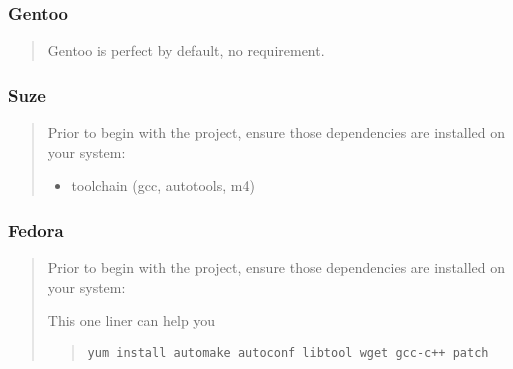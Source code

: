 \documentclass[letterpaper,10pt,english]{sphinxmanual}
\begin{document}
\subsubsection{Gentoo}
\label{installation:gentoo}\begin{quote}

Gentoo is perfect by default, no requirement.
\end{quote}


\subsubsection{Suze}
\label{installation:suze}\begin{quote}

Prior to begin with the project, ensure those dependencies are installed on
your system:
\begin{itemize}
\item {} 
toolchain (gcc, autotools, m4)

\end{itemize}
\end{quote}


\subsubsection{Fedora}
\label{installation:fedora}\begin{quote}

Prior to begin with the project, ensure those dependencies are installed on
your system:

This one liner can help you
\begin{quote}

\begin{Verbatim}[commandchars=\\\{\}]
yum install automake autoconf libtool wget gcc-c++ patch
\end{Verbatim}
\end{quote}
\end{quote}
\end{document}
